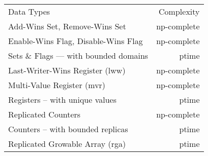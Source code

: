 \setlength{\tabcolsep}{1em}
\renewcommand{\arraystretch}{1.2}
\begin{tabular}{lr}
  \toprule
  Data Types & Complexity \\
  \cmidrule(lr){1-2}
  Add-Wins Set, Remove-Wins Set         & {\sc np}-complete \\
  Enable-Wins Flag, Disable-Wins Flag   & {\sc np}-complete \\
  Sets \& Flags — with bounded domains  & {\sc ptime} \\
  Last-Writer-Wins Register ({\sc lww}) & {\sc np}-complete \\
  Multi-Value Register ({\sc mvr})      & {\sc np}-complete \\
  Registers – with unique values        & {\sc ptime} \\
  Replicated Counters                   & {\sc np}-complete \\
  Counters – with bounded replicas      & {\sc ptime} \\
  Replicated Growable Array ({\sc rga}) & {\sc ptime} \\
  \bottomrule
\end{tabular}
